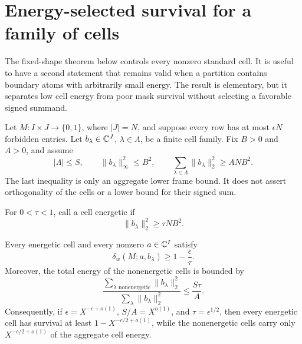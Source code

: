 \section{Energy-selected survival for a family of cells}
\label{sec:tpc50-frame-selection}

The fixed-shape theorem below controls every nonzero standard cell.
It is useful to have a second statement that remains valid when a
partition contains boundary atoms with arbitrarily small energy.  The
result is elementary, but it separates low cell energy from poor mask
survival without selecting a favorable signed summand.

Let \(M:I\times J\to\{0,1\}\), where \(|J|=N\), and suppose every row
has at most \(\epsilon N\) forbidden entries.  Let
\(b_\lambda\in\mathbb C^J\), \(\lambda\in\Lambda\), be a finite cell family.
Fix \(B>0\) and \(A>0\), and assume
\begin{equation}
 |\Lambda|\le S,
 \qquad
 \|b_\lambda\|_\infty^2\le B^2,
 \qquad
 \sum_{\lambda\in\Lambda}\|b_\lambda\|_2^2
 \ge ANB^2.
 \label{eq:tpc50-frame-hypotheses}
\end{equation}
The last inequality is only an aggregate lower frame bound.  It does
not assert orthogonality of the cells or a lower bound for their signed
sum.

For \(0<\tau<1\), call a cell energetic if
\begin{equation}
 \|b_\lambda\|_2^2\ge\tau NB^2.
 \label{eq:tpc50-energetic-cell}
\end{equation}

\begin{theorem}
\label{thm:tpc50-energy-selection}
Every energetic cell and every nonzero \(a\in\mathbb C^I\) satisfy
\begin{equation}
 \delta_w(M;a,b_\lambda)\ge1-\frac\epsilon\tau.
 \label{eq:tpc50-energetic-survival}
\end{equation}
Moreover, the total energy of the nonenergetic cells is bounded by
\begin{equation}
 \frac{\sum_{\lambda\text{ nonenergetic}}
             \|b_\lambda\|_2^2}
      {\sum_{\lambda}\|b_\lambda\|_2^2}
 \le\frac{S\tau}{A}.
 \label{eq:tpc50-low-cell-energy}
\end{equation}
Consequently, if
\(\epsilon=X^{-c+o(1)}\), \(S/A=X^{o(1)}\), and
\(\tau=\epsilon^{1/2}\), then every energetic cell has survival at least
\(1-X^{-c/2+o(1)}\), while the nonenergetic cells carry only
\(X^{-c/2+o(1)}\) of the aggregate cell energy.
\end{theorem}

